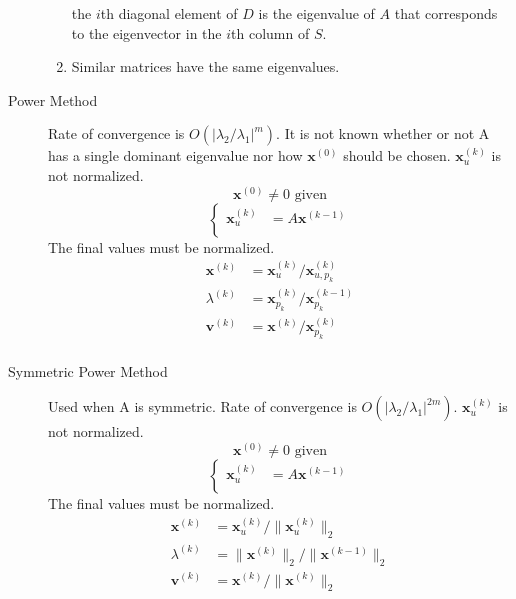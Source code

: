 \documentclass[8pt]{article}
\begin{document}
\begin{multicols}{2}
\begin{description}
\begin{enumerate}[i]
      the $i$th diagonal element of $D$ is the eigenvalue of $A$ that corresponds to the eigenvector
      in the $i$th column of $S$.
    \item Similar matrices have the same eigenvalues.
    \end{enumerate}
  \item[Power Method] Rate of convergence is $O(|\lambda_2/\lambda_1|^{m})$. It is not known whether
    or not A has a single dominant eigenvalue nor how $\mathbf{x}^{(0)}$ should be
    chosen. $\mathbf{x}^{(k)}_u$ is not normalized.
    $$\mathbf{x}^{(0)} \neq 0\text{ given}$$
    \begin{equation*}
      \left\{
        \begin{aligned}
          \mathbf{x}^{(k)}_u &= A\mathbf{x}^{(k-1)} \\
        \end{aligned}
      \right.
    \end{equation*}
    The final values must be normalized.
    \begin{equation*}
      \begin{aligned}
        \mathbf{x}^{(k)} &= \mathbf{x}^{(k)}_u/\mathbf{x}^{(k)}_{u,p_k} \\
        \lambda^{(k)} &=\mathbf{x}^{(k)}_{p_k}/\mathbf{x}^{(k-1)}_{p_k} \\
        \mathbf{v}^{(k)}&=\mathbf{x}^{(k)}/\mathbf{x}^{(k)}_{p_k} \\
      \end{aligned}
    \end{equation*}

  \item[Symmetric Power Method] Used when A is symmetric. Rate of convergence is
    $O(|\lambda_2/\lambda_1|^{2m})$. $\mathbf{x}^{(k)}_u$ is not normalized.
    $$\mathbf{x}^{(0)} \neq 0 \text{ given}$$
    \begin{equation*}
      \left\{
        \begin{aligned}
          \mathbf{x}^{(k)}_u &= A\mathbf{x}^{(k-1)} \\
        \end{aligned}
      \right.
    \end{equation*}
    The final values must be normalized.
    \begin{equation*}
      \begin{aligned}
        \mathbf{x}^{(k)} &= \mathbf{x}^{(k)}_u/\|\mathbf{x}^{(k)}_u\|_2 \\
        \lambda^{(k)} &=\|\mathbf{x}^{(k)}\|_2/\|\mathbf{x}^{(k-1)}\|_2 \\
        \mathbf{v}^{(k)}&=\mathbf{x}^{(k)}/\|\mathbf{x}^{(k)}\|_2 \\
      \end{aligned}
    \end{equation*}


\end{description}
\end{multicols}
\end{document}
